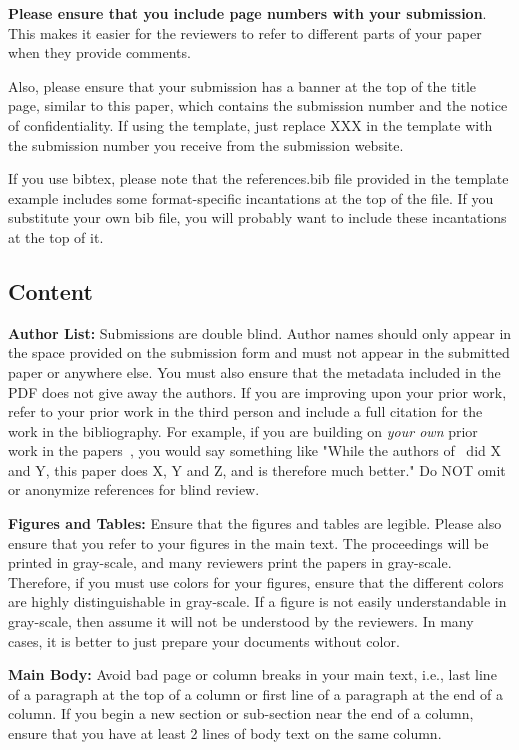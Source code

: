 \documentclass[pageno]{jpaper}
\begin{document}
\textbf{Please ensure that you include page numbers with your
submission}. This makes it easier for the reviewers to refer to
different parts of your paper when they provide comments.

Also, please ensure that your submission has a banner at the top of 
the title page, similar to this paper, which contains the submission
number and the notice of confidentiality.  If using the template,
just replace XXX in the template with the submission number
you receive from the submission website.

If you use bibtex, please note that the references.bib file provided
in the template example includes some format-specific incantations at
the top of the file.  If you substitute your own bib file, you will
probably want to include these incantations at the top of it.

\subsection{Content}

\noindent\textbf{Author List:} Submissions are double
blind. Author names should only appear in the space provided on the
submission form and must not appear in the submitted paper or anywhere
else.  You must also ensure that the metadata included in the PDF does
not give away the authors. If you are improving upon your prior work,
refer to your prior work in the third person and include a full
citation for the work in the bibliography. For example, if you are
building on {\em your own} prior work in the papers~\cite{nicepaper,
  nicepaper2}, you would say something like "While the authors
of~\cite{nicepaper, nicepaper2} did X and Y, this paper does X, Y and
Z, and is therefore much better."  Do NOT omit or anonymize references
for blind review.

\noindent\textbf{Figures and Tables:} Ensure that the figures and
tables are legible.  Please also ensure that you refer to your figures
in the main text. The proceedings will be printed in gray-scale, and
many reviewers print the papers in gray-scale. Therefore, if you must
use colors for your figures, ensure that the different colors are
highly distinguishable in gray-scale.  If a figure is not easily
understandable in gray-scale, then assume it will not be understood by
the reviewers.  In many cases, it is better to just prepare your
documents without color.

\noindent\textbf{Main Body:} Avoid bad page or column breaks in
your main text, i.e., last line of a paragraph at the top of a
column or first line of a paragraph at the end of a column. If you
begin a new section or sub-section near the end of a column,
ensure that you have at least 2 lines of body text on the same
column. 
\end{document}
